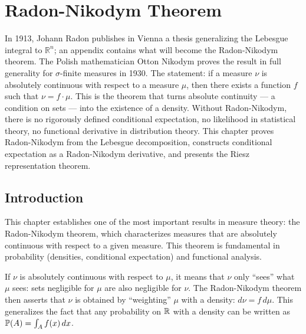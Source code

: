 \chapter{Radon-Nikodym Theorem}
\label{ch:radon_nikodym}

In 1913, Johann Radon publishes in Vienna a thesis generalizing the Lebesgue integral to $\mathbb{R}^n$; an appendix contains what will become the Radon-Nikodym theorem. The Polish mathematician Otton Nikodym proves the result in full generality for $\sigma$-finite measures in 1930. The statement: if a measure $\nu$ is absolutely continuous with respect to a measure $\mu$, then there exists a function $f$ such that $\nu = f \cdot \mu$. This is the theorem that turns absolute continuity --- a condition on sets --- into the existence of a density. Without Radon-Nikodym, there is no rigorously defined conditional expectation, no likelihood in statistical theory, no functional derivative in distribution theory. This chapter proves Radon-Nikodym from the Lebesgue decomposition, constructs conditional expectation as a Radon-Nikodym derivative, and presents the Riesz representation theorem.

\section{Introduction}

This chapter establishes one of the most important results in measure theory: the
Radon-Nikodym theorem, which characterizes measures
that are absolutely continuous with respect to a given measure. This theorem is
fundamental in probability (densities, conditional expectation) and functional analysis.

\begin{intuition}[title=\textbf{Radon-Nikodym: changing the reference measure}]
If $\nu$ is absolutely continuous with respect to $\mu$, it means that $\nu$ only
``sees'' what $\mu$ sees: sets negligible for $\mu$ are also negligible for $\nu$.
The Radon-Nikodym theorem then asserts that $\nu$ is obtained by ``weighting'' $\mu$
with a density: $d\nu = f\, d\mu$. This generalizes the fact that any probability
on $\mathbb{R}$ with a density can be written as $\mathbb{P}(A) = \int_A f(x)\, dx$.
\end{intuition}


